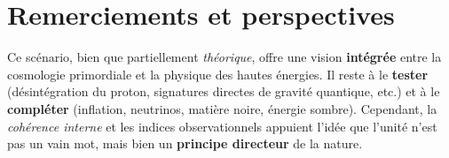 \documentclass[12pt]{article}
\begin{document}
\bigskip

\begin{center}
\end{center}

\section*{Remerciements et perspectives}

Ce sc\'enario, bien que partiellement \emph{th\'eorique}, offre une vision 
\textbf{int\'egr\'ee} entre la cosmologie primordiale et la physique des hautes \'energies. 
Il reste \`a le \textbf{tester} (d\'esint\'egration du proton, signatures directes 
de gravit\'e quantique, etc.) et \`a le \textbf{compl\'eter} (inflation, neutrinos, 
mati\`ere noire, \'energie sombre). 
Cependant, la \emph{coh\'erence interne} et les indices observationnels 
appuient l'id\'ee que l'unit\'e n'est pas un vain mot, mais bien 
un \textbf{principe directeur} de la nature.

\vspace{1em}
\end{document}
